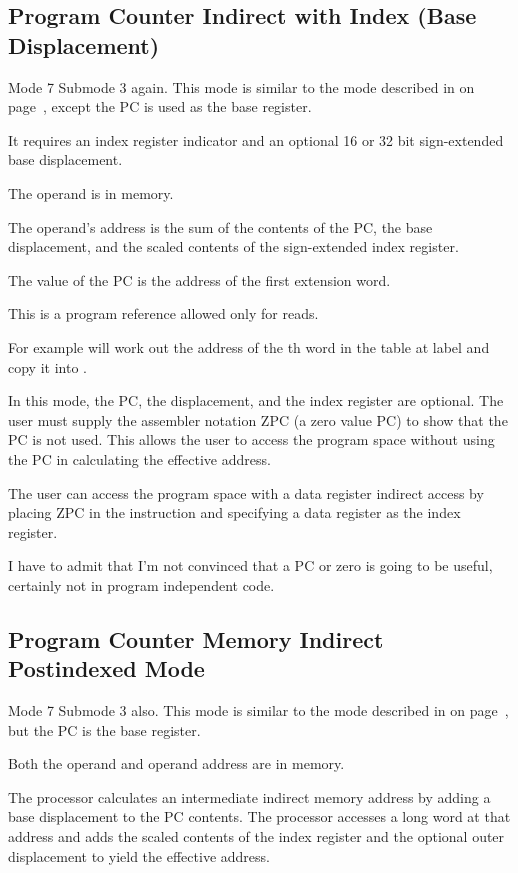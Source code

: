 \subsection{Program Counter Indirect with Index (Base Displacement)}
Mode 7 Submode 3 again. This mode is similar to the mode described in \emph{} on page~\pageref{sub-ARegIIbd}, except the PC is used as the base register. 

It requires an index register indicator and an optional 16 or 32 bit sign-extended base displacement. 

The operand is in memory. 

The operand’s address is the sum of the contents of the PC, the base displacement, and the scaled contents of the sign-extended index register. 

The value of the PC is the address of the first extension word.

This is a program reference allowed only for reads.

For example  will work out the address of the th word in the table at label  and copy it into .

In this mode, the PC, the displacement, and the index register are optional. The user must supply the assembler notation ZPC (a zero value PC) to show that the PC is not used. This allows the user to access the program space without using the PC in calculating the effective address. 

The user can access the program space with a data register indirect access by placing ZPC in the instruction and specifying a data register as the index register.

I have to admit that I'm not convinced that a PC or zero is going to be useful, certainly not in program independent code.

\subsection{Program Counter Memory Indirect Postindexed Mode}
Mode 7 Submode 3 also. This mode is similar to the mode described in \emph{} on page~\pageref{sub-MIPostI}, but the PC is the base register. 

Both the operand and operand address are in memory. 

The processor calculates an intermediate indirect memory address by adding a base
displacement to the PC contents. The processor accesses a long word at that address and
adds the scaled contents of the index register and the optional outer displacement to yield the effective address. 

